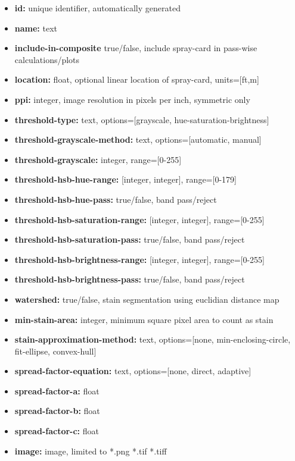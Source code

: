 \documentclass[10pt,letterpaper,titlepage]{article}
\begin{document}
\begin{itemize}
\begin{itemize}
\begin{itemize}
\begin{itemize}
                    \item \textbf{id:} unique identifier, automatically generated
                    \item \textbf{name:} text
                    \item \textbf{include-in-composite} true/false, include spray-card in pass-wise calculations/plots
                    \item \textbf{location:} float, optional linear location of spray-card, units=[ft,m]
                    \item \textbf{ppi:} integer, image resolution in pixels per inch, symmetric only
                    \item \textbf{threshold-type:} text, options=[grayscale, hue-saturation-brightness]
                    \item \textbf{threshold-grayscale-method:} text, options=[automatic, manual]
                    \item \textbf{threshold-grayscale:} integer, range=[0-255]
                    \item \textbf{threshold-hsb-hue-range:} [integer, integer], range=[0-179]
                    \item \textbf{threshold-hsb-hue-pass:} true/false, band pass/reject
                    \item \textbf{threshold-hsb-saturation-range:} [integer, integer], range=[0-255]
                    \item \textbf{threshold-hsb-saturation-pass:} true/false, band pass/reject
                    \item \textbf{threshold-hsb-brightness-range:} [integer, integer], range=[0-255]
                    \item \textbf{threshold-hsb-brightness-pass:} true/false, band pass/reject
                    \item \textbf{watershed:} true/false, stain segmentation using euclidian distance map
                    \item \textbf{min-stain-area:} integer, minimum square pixel area to count as stain
                    \item \textbf{stain-approximation-method:} text, options=[none, min-enclosing-circle, fit-ellipse, convex-hull]
                    \item \textbf{spread-factor-equation:} text, options=[none, direct, adaptive]
                    \item \textbf{spread-factor-a:} float
                    \item \textbf{spread-factor-b:} float
                    \item \textbf{spread-factor-c:} float
                    \item \textbf{image:} image, limited to *.png *.tif *.tiff
                \end{itemize}
            \end{itemize}
        \end{itemize}
    \end{itemize}
\end{document}

